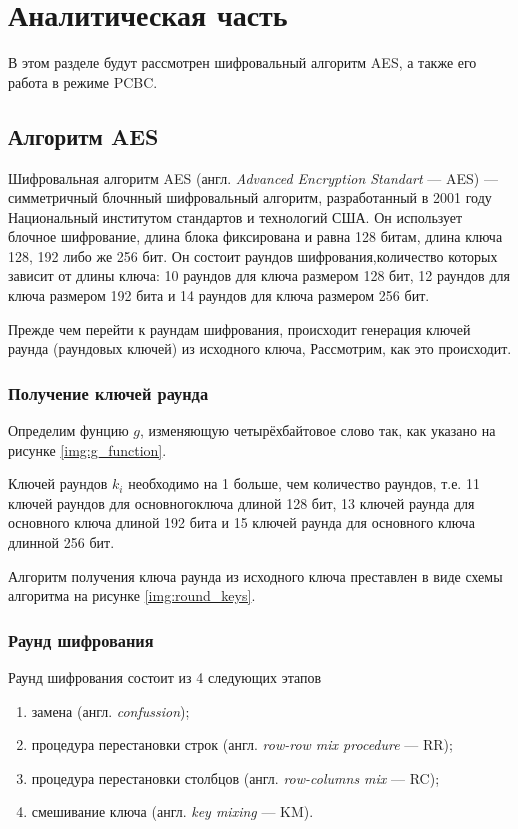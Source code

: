 \chapter{Аналитическая часть}
В этом разделе будут рассмотрен шифровальный алгоритм AES, а также его работа в режиме PCBC.


\section{Алгоритм AES}

Шифровальная алгоритм AES (англ. \textit{Advanced Encryption Standart} --- AES) --- симметричный блочнный шифровальный алгоритм, разработанный в 2001 году Национальный институтом стандартов и технологий США. Он использует блочное шифрование, длина блока фиксирована и равна 128 битам, длина ключа 128, 192 либо же 256 бит. Он состоит раундов шифрования,количество которых зависит от длины ключа: 10 раундов для ключа размером 128 бит, 12 раундов для ключа размером 192 бита и 14 раундов для ключа размером 256 бит.

Прежде чем перейти к раундам шифрования, происходит генерация ключей раунда (раундовых ключей) из исходного ключа, Рассмотрим, как это происходит.

\subsection{Получение ключей раунда}

Определим фунцию $g$, изменяющую четырёхбайтовое слово так, как указано на рисунке \ref{img:g_function}.



Ключей раундов $k_{i}$ необходимо на 1 больше, чем количество раундов, т.е. 11 ключей раундов для основногоключа длиной 128 бит, 13 ключей раунда для основного ключа длиной 192 бита и 15 ключей раунда для основного ключа длинной 256 бит.

Алгоритм получения ключа раунда из исходного ключа преставлен в виде схемы алгоритма на рисунке \ref{img:round_keys}.


\clearpage
\subsection{Раунд шифрования}

Раунд шифрования состоит из 4 следующих этапов
\begin{enumerate}[label=\arabic*)]
	\item замена (англ. \textit{confussion});
    \item процедура перестановки строк (англ. \textit{row-row mix procedure} --- RR);
	\item процедура перестановки столбцов (англ. \textit{row-columns mix} --- RC);
	\item смешивание ключа (англ. \textit{key mixing} --- KM).
\end{enumerate}

